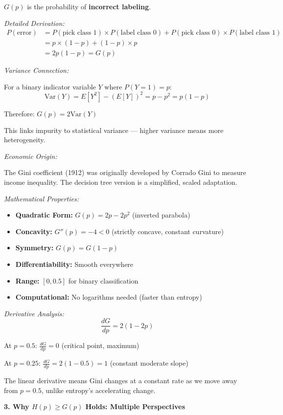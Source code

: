 \documentclass[12pt]{article}
\begin{document}
\begin{explanation}
$G(p)$ is the probability of \textbf{incorrect labeling}.

\textit{Detailed Derivation:}
\begin{align*}
P(\text{error}) &= P(\text{pick class 1}) \times P(\text{label class 0}) + P(\text{pick class 0}) \times P(\text{label class 1}) \\
&= p \times (1-p) + (1-p) \times p \\
&= 2p(1-p) = G(p)
\end{align*}

\textit{Variance Connection:}

For a binary indicator variable $Y$ where $P(Y=1) = p$:
\[
\text{Var}(Y) = E[Y^2] - (E[Y])^2 = p - p^2 = p(1-p)
\]

Therefore: $G(p) = 2\text{Var}(Y)$

This links impurity to statistical variance — higher variance means more heterogeneity.

\textit{Economic Origin:}

The Gini coefficient (1912) was originally developed by Corrado Gini to measure income inequality. The decision tree version is a simplified, scaled adaptation.

\textit{Mathematical Properties:}
\begin{itemize}
    \item \textbf{Quadratic Form:} $G(p) = 2p - 2p^2$ (inverted parabola)
    \item \textbf{Concavity:} $G''(p) = -4 < 0$ (strictly concave, constant curvature)
    \item \textbf{Symmetry:} $G(p) = G(1-p)$
    \item \textbf{Differentiability:} Smooth everywhere
    \item \textbf{Range:} $[0, 0.5]$ for binary classification
    \item \textbf{Computational:} No logarithms needed (faster than entropy)
\end{itemize}

\textit{Derivative Analysis:}
\[
\frac{dG}{dp} = 2(1-2p)
\]

At $p=0.5$: $\frac{dG}{dp} = 0$ (critical point, maximum)

At $p=0.25$: $\frac{dG}{dp} = 2(1-0.5) = 1$ (constant moderate slope)

The linear derivative means Gini changes at a constant rate as we move away from $p=0.5$, unlike entropy's accelerating change.

\textbf{3. Why $H(p) \geq G(p)$ Holds: Multiple Perspectives}


\end{explanation}
\end{document}
